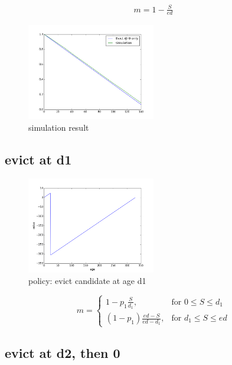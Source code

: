 \documentclass[12pt, letterpaper]{article}
\begin{document}
\begin{equation}
\begin{aligned}
m = 1 - \frac{S}{ed}
\end{aligned}
\end{equation}

\begin{figure}[H]
\centering
\includegraphics[width=0.5\textwidth]{sim_mru}
\caption{simulation result}
\end{figure}

\subsection{evict at d1}

\begin{figure}[H]
\centering
\includegraphics[width=0.5\textwidth]{evict_d1}
\caption{policy: evict candidate at age d1}
\end{figure}

\[
m = \left\{\begin{array}{lr}
      1-p_1 \frac{S}{d_1}, & \text{for } 0 \leq S \leq d_1 \\
      (1-p_1) \frac{ed-S}{ed-d_1}, & \text{for } d_1 \leq S \leq ed
           \end{array}
\]


\subsection{evict at d2, then 0}
\end{document}
